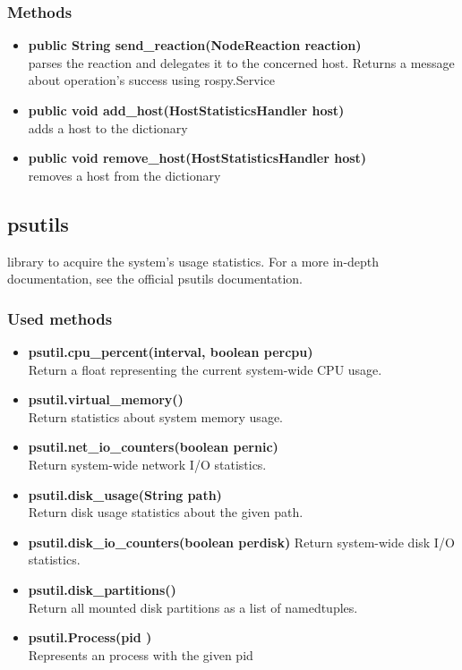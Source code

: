 \subsubsection{Methods}
\begin{itemize}
	\item \textbf{public String send\_reaction(NodeReaction reaction)}\\
	parses the reaction and delegates it to the concerned host.
	Returns a message about operation's success using rospy.Service
	\item \textbf{public void add\_host(HostStatisticsHandler host)}\\
	adds a host to the dictionary
	\item \textbf{public void remove\_host(HostStatisticsHandler host)}\\
	removes a host from the dictionary
\end{itemize}
	
\subsection{psutils}
library to acquire the system's usage statistics. For a more in-depth documentation, see the official psutils documentation.

\subsubsection{Used methods}
\begin{itemize}
	\item \textbf{psutil.cpu\_percent(interval, boolean percpu)}\\
	Return a float representing the current system-wide CPU usage.
	\item \textbf{psutil.virtual\_memory()}\\
	Return statistics about system memory usage.
	\item \textbf{psutil.net\_io\_counters(boolean pernic)}\\
	Return system-wide network I/O statistics.
	\item \textbf{psutil.disk\_usage(String path)}\\
	Return disk usage statistics about the given path.
	\item \textbf{psutil.disk\_io\_counters(boolean perdisk)}
	Return system-wide disk I/O statistics.
	\item \textbf{psutil.disk\_partitions()}\\
	Return all mounted disk partitions as a list of namedtuples.
	\item \textbf{psutil.Process(pid )}\\
	Represents an  process with the given pid
\end{itemize}


	